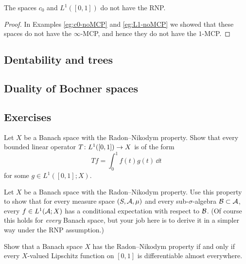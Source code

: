 \begin{cor}
  The spaces $c_0$ and $L^1([0,1])$ do not have the RNP.
\end{cor}

\begin{proof}
  In Examples \ref{eg:c0-noMCP} and \ref{eg:L1-noMCP} we showed that these spaces do not have the $\infty$-MCP, and hence they do not have the $1$-MCP. 
\end{proof}


\subsection{Dentability and trees}


\subsection{Duality of Bochner spaces}


\subsection*{Exercises}


\begin{exercise}
  Let $X$ be a Banach space with the Radon--Nikodym property.
  Show that every bounded linear operator $T \colon L^1([0,1]) \rightarrow X$ is of the form
  \begin{equation*}
    Tf = \int_0^1 f(t) g(t) \, \dd t
  \end{equation*}
  for some $g \in L^1([0,1];X)$.
\end{exercise}

\begin{exercise}
  Let $X$ be a Banach space with the Radon--Nikodym property.
  Use this property to show that for every measure space $(S,\mathcal{A},\mu)$ and every sub-$\sigma$-algebra $\mathcal{B} \subset \mathcal{A}$, every $f \in L^1(\mathcal{A};X)$ has a conditional expectation with respect to $\mathcal{B}$.
  (Of course this holds for \emph{every} Banach space, but your job here is to derive it in a simpler way under the RNP assumption.)
\end{exercise}

\begin{exercise}
  Show that a Banach space $X$ has the Radon--Nikodym property if and only if every $X$-valued Lipschitz function on $[0,1]$ is differentiable almost everywhere.
\end{exercise}


